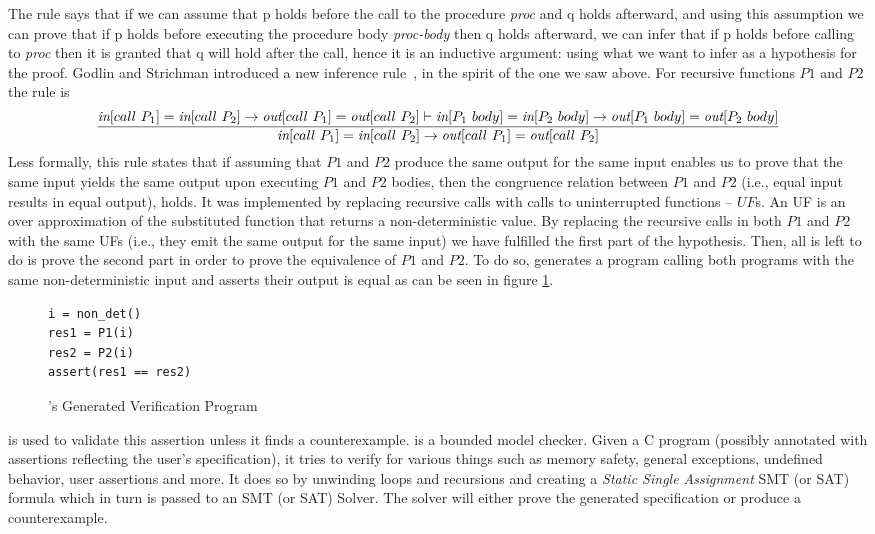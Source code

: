 The rule says that if we can assume that {p} holds before the call to the procedure \emph{proc} and {q} holds afterward, and using this assumption we can prove that if {p} holds before executing the procedure body \emph{proc-body} then {q} holds afterward, we can infer that if {p} holds before calling to \emph{proc} then it is granted that {q} will hold after the call, hence it is an inductive argument: using what we want to infer as a hypothesis for the proof. Godlin and Strichman introduced a new inference rule~\cite{DBLP:conf/dac/GodlinS09}, in the spirit of the one we saw above. For recursive functions $P1$ and $P2$ the rule is
\begin{equation}
 {\frac {{\emph{in}[call\ P_1]=\emph{in}[call\ P_2]\rightarrow \emph{out}[call\ P_1]=\emph{out}[call\ P_2]} \vdash{\emph{in}[P_1\ body]=\emph{in}[P_2\ body]\rightarrow \emph{out}[P_1\ body]=\emph{out}[P_2\ body]} }
{{\emph{in}[call\ P_1]=\emph{in}[call\ P_2]\rightarrow \emph{out}[call\ P_1]=\emph{out}[call\ P_2]}}} 
\end{equation}
Less formally, this rule states that if  assuming that $P1$ and $P2$ produce the same output for the same input enables us to prove that the same input yields the same output upon executing $P1$ and $P2$ bodies, then the congruence relation between $P1$ and $P2$ (i.e., equal input results in equal output), holds. It was implemented by replacing recursive calls with calls to uninterrupted functions – $UF$s. An UF is an over approximation of the substituted function that returns a non-deterministic value. By replacing the recursive calls in both $P1$ and $P2$ with the same UFs (i.e., they emit the same output for the same input) we have fulfilled the first part of the hypothesis. Then, all is left to do is prove the second part in order to prove the equivalence of $P1$ and $P2$. To do so,  generates a program calling both programs with the same non-deterministic input and asserts their output is equal as can be seen in figure \ref{fig:rvtmainprogram}.
\begin{figure}[h]
\begin{center}
\begin{minipage}{7 cm}

\begin{lstlisting}
i = non_det()
res1 = P1(i)
res2 = P2(i)
assert(res1 == res2) 
\end{lstlisting}
\end{minipage}
\caption{'s Generated Verification Program}
\label{fig:rvtmainprogram}
\end{center}
\end{figure}
 is used to validate this assertion unless it finds a counterexample.  is a bounded model checker. Given a C program (possibly annotated with assertions reflecting the user's specification), it tries to verify for various things such as memory safety, general exceptions, undefined behavior, user assertions and more. It does so by unwinding loops and recursions and creating a \emph{Static Single Assignment} SMT (or SAT) formula which in turn is passed to an SMT (or SAT) Solver. The solver will either prove the generated specification or produce a counterexample. 

